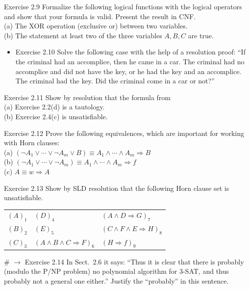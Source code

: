 \documentclass[10pt]{book}
\begin{document}
Exercise 2.9 Formalize the following logical functions with the logical operators and show that your formula is valid. Present the result in CNF.\\
(a) The XOR operation (exclusive or) between two variables.\\
(b) The statement at least two of the three variables $A, B, C$ are true.

\begin{itemize}
  \item Exercise 2.10 Solve the following case with the help of a resolution proof: ``If the criminal had an accomplice, then he came in a car. The criminal had no accomplice and did not have the key, or he had the key and an accomplice. The criminal had the key. Did the criminal come in a car or not?''
\end{itemize}

Exercise 2.11 Show by resolution that the formula from\\
(a) Exercise 2.2(d) is a tautology.\\
(b) Exercise 2.4(c) is unsatisfiable.

Exercise 2.12 Prove the following equivalences, which are important for working with Horn clauses:\\
(a) $\left(\neg A_{1} \vee \cdots \vee \neg A_{m} \vee B\right) \equiv A_{1} \wedge \cdots \wedge A_{m} \Rightarrow B$\\
(b) $\left(\neg A_{1} \vee \cdots \vee \neg A_{m}\right) \equiv A_{1} \wedge \cdots \wedge A_{m} \Rightarrow f$\\
(c) $A \equiv w \Rightarrow A$

Exercise 2.13 Show by SLD resolution that the following Horn clause set is unsatisfiable.

\begin{center}
\begin{tabular}{lll}
$(A)_{1}$ & $(D)_{4}$ & $(A \wedge D \Rightarrow G)_{7}$ \\
$(B)_{2}$ & $(E)_{5}$ & $(C \wedge F \wedge E \Rightarrow H)_{8}$ \\
$(C)_{3}$ & $(A \wedge B \wedge C \Rightarrow F)_{6}$ & $(H \Rightarrow f)_{9}$ \\
\end{tabular}
\end{center}

\# $\rightarrow$ Exercise 2.14 In Sect.\ 2.6 it says: ``Thus it is clear that there is probably (modulo the P/NP problem) no polynomial algorithm for 3-SAT, and thus probably not a general one either.'' Justify the ``probably'' in this sentence.
\end{document}
